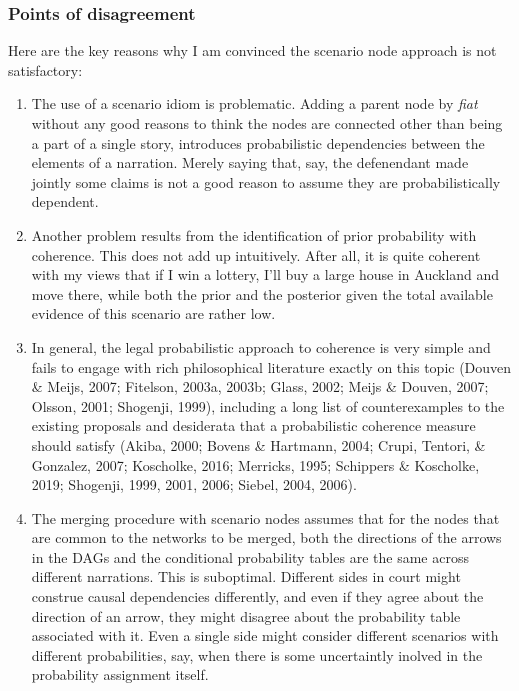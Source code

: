 \documentclass[11pt,dvipsnames,enabledeprecatedfontcommands]{scrartcl}
\begin{document}
\subsubsection{Points of disagreement}\label{points-of-disagreement}

Here are the key reasons why I am convinced the scenario node approach
is not satisfactory:

\begin{enumerate}
\def\labelenumi{\Alph{enumi}.}
\item
  The use of a scenario idiom is problematic. Adding a parent node by
  \emph{fiat} without any good reasons to think the nodes are connected
  other than being a part of a single story, introduces probabilistic
  dependencies between the elements of a narration. Merely saying that,
  say, the defenendant made jointly some claims is not a good reason to
  assume they are probabilistically dependent.
\item
  Another problem results from the identification of prior probability
  with coherence. This does not add up intuitively. After all, it is
  quite coherent with my views that if I win a lottery, I'll buy a large
  house in Auckland and move there, while both the prior and the
  posterior given the total available evidence of this scenario are
  rather low.
\item
  In general, the legal probabilistic approach to coherence is very
  simple and fails to engage with rich philosophical literature exactly
  on this topic (Douven \& Meijs, 2007; Fitelson, 2003a, 2003b; Glass,
  2002; Meijs \& Douven, 2007; Olsson, 2001; Shogenji, 1999), including
  a long list of counterexamples to the existing proposals and
  desiderata that a probabilistic coherence measure should satisfy
  (Akiba, 2000; Bovens \& Hartmann, 2004; Crupi, Tentori, \& Gonzalez,
  2007; Koscholke, 2016; Merricks, 1995; Schippers \& Koscholke, 2019;
  Shogenji, 1999, 2001, 2006; Siebel, 2004, 2006).
\item
  The merging procedure with scenario nodes assumes that for the nodes
  that are common to the networks to be merged, both the directions of
  the arrows in the DAGs and the conditional probability tables are the
  same across different narrations. This is suboptimal. Different sides
  in court might construe causal dependencies differently, and even if
  they agree about the direction of an arrow, they might disagree about
  the probability table associated with it. Even a single side might
  consider different scenarios with different probabilities, say, when
  there is some uncertaintly inolved in the probability assignment
  itself.
\end{enumerate}
\end{document}
